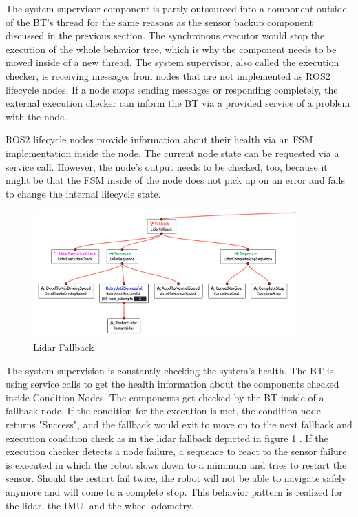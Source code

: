 The system supervisor component is partly outsourced into a component outside of the BT's thread for the same reasons as the sensor backup component discussed in the previous section. The synchronous executor would stop the execution of the whole behavior tree, which is why the component needs to be moved inside of a new thread. The system supervisor, also called the execution checker, is receiving messages from nodes that are not implemented as ROS2 lifecycle nodes. If a node stops sending messages or responding completely, the external execution checker can inform the BT via a provided service of a problem with the node. 

ROS2 lifecycle nodes provide information about their health via an FSM implementation inside the node. The current node state can be requested via a service call. However, the node's output needs to be checked, too, because it might be that the FSM inside of the node does not pick up on an error and fails to change the internal lifecycle state. 

\begin{figure}[ht]
	\centering
	\includegraphics[width=0.9\textwidth]{images/sensor_fallback_inverted.png}
	\caption{Lidar Fallback}
	\label{fig:lidar_fallback}
\end{figure}

The system supervision is constantly checking the system's health. The BT is using service calls to get the health information about the components checked inside Condition Nodes. The components get checked by the BT inside of a fallback node. If the condition for the execution is met, the condition node returns "Success", and the fallback would exit to move on to the next fallback and execution condition check as in the lidar fallback depicted in figure  \ref{fig:lidar_fallback} . If the execution checker detects a node failure, a sequence to react to the sensor failure is executed in which the robot slows down to a minimum and tries to restart the sensor. Should the restart fail twice, the robot will not be able to navigate safely anymore and will come to a complete stop. This behavior pattern is realized for the lidar, the IMU, and the wheel odometry. 

